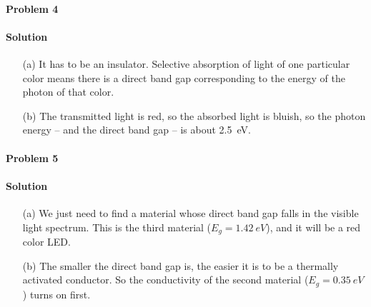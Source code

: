 \documentclass[hyperref, a4paper]{article}
\begin{document}
\paragraph{Problem 4}

\paragraph{Solution} \begin{itemize}
\item[(a)] It has to be an insulator.
Selective absorption of light of one particular color 
means there is a direct band gap corresponding to the energy 
of the photon of that color.
\item[(b)] The transmitted light is red, 
so the absorbed light is bluish,
so the photon energy -- and the direct band gap -- 
is about \SI{2.5}{eV}.
\end{itemize}

\paragraph{Problem 5}

\paragraph{Solution} \begin{itemize}
\item[(a)] We just need to find a material whose direct band gap falls in the visible light spectrum.
This is the third material ($E_g = \SI{1.42}{eV}$), 
and it will be a red color LED.
\item[(b)] The smaller the direct band gap is, 
the easier it is to be a thermally activated conductor.
So the conductivity of the second material ($E_{g} = \SI{0.35}{eV}$) 
turns on first.
\end{itemize}
\end{document}
